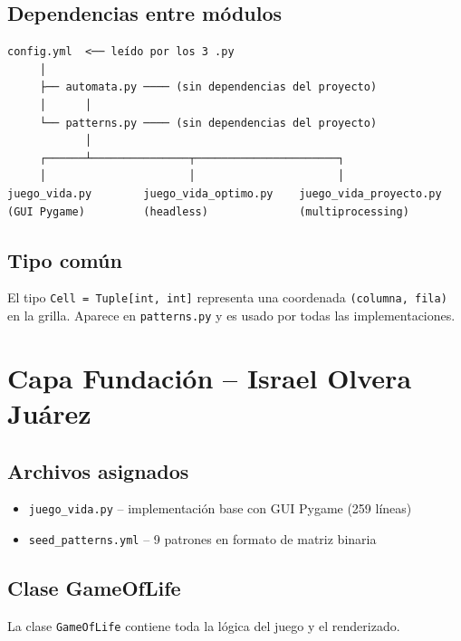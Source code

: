 \documentclass[12pt,a4paper]{article}
\begin{document}
\subsection{Dependencias entre módulos}

\begin{verbatim}
config.yml  <── leído por los 3 .py
     │
     ├── automata.py ──── (sin dependencias del proyecto)
     │      │
     └── patterns.py ──── (sin dependencias del proyecto)
            │
     ┌──────┴───────────────┬──────────────────────┐
     │                      │                      │
juego_vida.py        juego_vida_optimo.py    juego_vida_proyecto.py
(GUI Pygame)         (headless)              (multiprocessing)
\end{verbatim}

\subsection{Tipo común}

El tipo \texttt{Cell = Tuple[int, int]} representa una coordenada \texttt{(columna, fila)}
en la grilla. Aparece en \texttt{patterns.py} y es usado por todas las implementaciones.

\newpage

\section{Capa Fundación -- Israel Olvera Juárez}

\subsection{Archivos asignados}

\begin{itemize}
  \item \texttt{juego\_vida.py} -- implementación base con GUI Pygame (259 líneas)
  \item \texttt{seed\_patterns.yml} -- 9 patrones en formato de matriz binaria
\end{itemize}

\subsection{Clase GameOfLife}

La clase \texttt{GameOfLife} contiene toda la lógica del juego y el renderizado.
\end{document}

